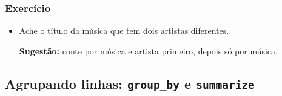 \documentclass[
  letterpaper,
  DIV=11,
  numbers=noendperiod]{scrreprt}
\begin{document}
\subsubsection{Exercício}\label{exercuxedcio-1}

\begin{itemize}
\item
  Ache o título da música que tem dois artistas diferentes.

  \textbf{Sugestão:} conte por música e artista primeiro, depois só por
  música.
\end{itemize}

\subsection{\texorpdfstring{Agrupando linhas: \texttt{group\_by} e
\texttt{summarize}}{Agrupando linhas: group\_by e summarize}}\label{agrupando-linhas-group_by-e-summarize}
\end{document}
